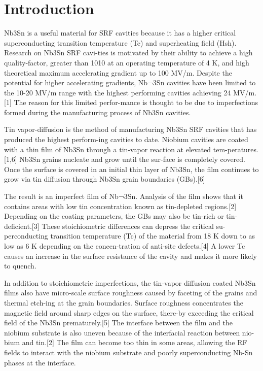 
\section{Introduction}

Nb3Sn is a useful material for SRF cavities because it has a higher critical superconducting transition temperature (Tc) and superheating field (Hsh). Research on Nb3Sn SRF cavi-ties is motivated by their ability to achieve a high quality-factor, greater than 1010 at an operating temperature of 4 K, and high theoretical maximum accelerating gradient up to 100 MV/m. Despite the potential for higher accelerating gradients, Nb¬3Sn cavities have been limited to the 10-20 MV/m range with the highest performing cavities achieving 24 MV/m.[1] The reason for this limited perfor-mance is thought to be due to imperfections formed during the manufacturing process of Nb3Sn cavities. 

Tin vapor-diffusion is the method of manufacturing Nb3Sn SRF cavities that has produced the highest perform-ing cavities to date. Niobium cavities are coated with a thin film of Nb3Sn through a tin-vapor reaction at elevated tem-peratures.[1,6] Nb3Sn grains nucleate and grow until the sur-face is completely covered. Once the surface is covered in an initial thin layer of Nb3Sn, the film continues to grow via tin diffusion through Nb3Sn grain boundaries (GBs).[6] 

The result is an imperfect film of Nb¬3Sn. Analysis of the film shows that it contains areas with low tin concentration known as tin-depleted regions.[2] Depending on the coating parameters, the GBs may also be tin-rich or tin-deficient.[3] These stoichiometric differences can depress the critical su-perconducting transition temperature (Tc) of the material from 18 K down to as low as 6 K depending on the concen-tration of anti-site defects.[4] A lower Tc causes an increase in the surface resistance of the cavity and makes it more likely to quench.

In addition to stoichiometric imperfections, the tin-vapor diffusion coated Nb3Sn films also have micro-scale surface roughness caused by faceting of the grains and thermal etch-ing at the grain boundaries. Surface roughness concentrates the magnetic field around sharp edges on the surface, there-by exceeding the critical field of the Nb3Sn prematurely.[5] The interface between the film and the niobium substrate is also uneven because of the interfacial reaction between nio-bium and tin.[2] The film can become too thin in some areas, allowing the RF fields to interact with the niobium substrate and poorly superconducting Nb-Sn phases at the interface.

